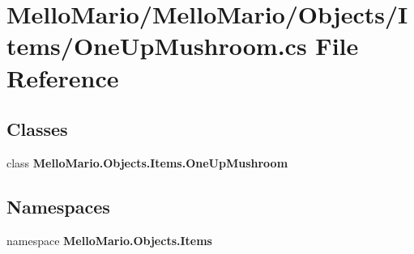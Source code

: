 \section{Mello\+Mario/\+Mello\+Mario/\+Objects/\+Items/\+One\+Up\+Mushroom.cs File Reference}
\label{OneUpMushroom_8cs}
\subsection*{Classes}
\begin{DoxyCompactItemize}
\item 
class \textbf{ Mello\+Mario.\+Objects.\+Items.\+One\+Up\+Mushroom}
\end{DoxyCompactItemize}
\subsection*{Namespaces}
\begin{DoxyCompactItemize}
\item 
namespace \textbf{ Mello\+Mario.\+Objects.\+Items}
\end{DoxyCompactItemize}
